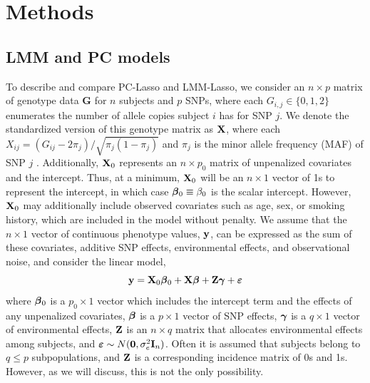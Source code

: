 \section{Methods} \label{sec:methods}



\subsection{LMM and PC models}


To describe and compare PC-Lasso and LMM-Lasso, we consider an $n \times p$ matrix of genotype data $\boldsymbol{G}$ for $n$ subjects and $p$ SNPs, where each $G_{i,j} \in \{ 0, 1, 2 \}$ enumerates the number of allele copies subject $i$ has for SNP $j$.  We denote the standardized version of this genotype matrix as $\textbf{X}$, where each $X_{ij} = (G_{ij} - 2 \pi_j) / \sqrt{\pi_j (1 - \pi_j)}$ and $\pi_j$ is the minor allele frequency (MAF) of SNP $j$ \citep{zhang2015principal, price2006principal}. Additionally, $\textbf{X}_0$ represents an $n \times p_0$ matrix of unpenalized covariates and the intercept. Thus, at a minimum, $\textbf{X}_0$ will be an $n \times 1$ vector of 1s to represent the intercept, in which case $\boldsymbol{\beta}{}_0 \equiv \beta_0$ is the scalar intercept. However, $\textbf{X}_0$ may additionally include observed covariates such as age, sex, or smoking history, which are included in the model without penalty. We assume that the $n \times 1$ vector of continuous phenotype values, $\textbf{y}$, can be expressed as the sum of these covariates, additive SNP effects, environmental effects, and observational noise, and consider the linear model,
\begin{equation}
    \label{eqn:model}
    \textbf{y} = \textbf{X}_0 \boldsymbol{\beta}{}_0 + \textbf{X}\boldsymbol{\beta}{} + \textbf{Z}\boldsymbol{\gamma} + \boldsymbol{\varepsilon}{}
\end{equation}
where $\boldsymbol{\beta}{}_0$ is a $p_0 \times 1$ vector which includes the intercept term and the effects of any unpenalized covariates, $\boldsymbol{\beta}{}$ is a $p \times 1$ vector of SNP effects, $\boldsymbol{\gamma}$ is a $q \times 1$ vector of environmental effects, $\textbf{Z}$ is an $n \times q$ matrix that allocates environmental effects among subjects, and $\boldsymbol{\varepsilon}{} \sim N(\boldsymbol{0}, \sigma^2_e \textbf{I}_n)$. Often it is assumed that subjects belong to $q \le p$ subpopulations, and $\textbf{Z}$ is a corresponding incidence matrix of 0s and 1s. However, as we will discuss, this is not the only possibility.

